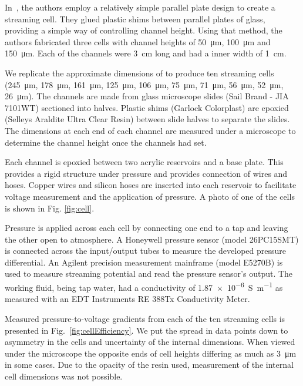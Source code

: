 \documentclass[10pt,final,journal]{IEEEtran}
\begin{document}
    In~\cite{Gu2000}, the authors employ a relatively simple parallel plate design to create a streaming cell.
    They glued plastic shims between parallel plates of glass, providing a simple way of controlling channel height.
    Using that method, the authors fabricated three cells with channel heights of \SI{50}{\micro\metre}, \SI{100}{\micro\metre} and \SI{150}{\micro\metre}.
    Each of the channels were \SI{3}{\centi\metre} long and had a inner width of \SI{1}{\centi\metre}.

    We replicate the approximate dimensions of \cite{Gu2000} to produce ten streaming cells (\SI{245}{\micro\meter}, \SI{178}{\micro\meter}, \SI{161}{\micro\meter}, \SI{125}{\micro\meter}, \SI{106}{\micro\meter}, \SI{75}{\micro\meter}, \SI{71}{\micro\meter}, \SI{56}{\micro\meter}, \SI{52}{\micro\meter}, \SI{26}{\micro\meter}).
    The channels are made from glass microscope slides (Sail Brand - JIA 7101WT) sectioned into halves.
    Plastic shims (Garlock Colorplast) are epoxied (Selleys Araldite Ultra Clear Resin) between slide halves to separate the slides.
    The dimensions at each end of each channel are measured under a microscope to determine the channel height once the channels had set.

    Each channel is epoxied between two acrylic reservoirs and a base plate.
    This provides a rigid structure under pressure and provides connection of wires and hoses.
    Copper wires and silicon hoses are inserted into each reservoir to facilitate voltage measurement and the application of pressure.
    A photo of one of the cells is shown in Fig. \ref{fig:cell}.

    Pressure is applied across each cell by connecting one end to a tap and leaving the other open to atmosphere.
    A Honeywell pressure sensor (model 26PC15SMT) is connected across the input/output tubes to measure the developed pressure differential.
    An Agilent precision measurement mainframe (model E5270B) is used to measure streaming potential and read the pressure sensor's output.
    The working fluid, being tap water, had a conductivity of \SI{1.87e-6}{\siemens\per\meter} as measured with an EDT Instruments RE 388Tx Conductivity Meter.

    Measured pressure-to-voltage gradients from each of the ten streaming cells is presented in Fig.~\ref{fig:cellEfficiency}.
    We put the spread in data points down to asymmetry in the cells and uncertainty of the internal dimensions.
    When viewed under the microscope the opposite ends of cell heights differing as much as \SI{3}{\micro\meter} in some cases.
    Due to the opacity of the resin used, measurement of the internal cell dimensions was not possible.
\end{document}
